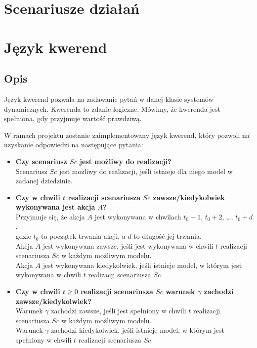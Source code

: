 \documentclass{article}
\begin{document}
\section{Scenariusze działań}


\section{Język kwerend}

\subsection{Opis}
Język kwerend pozwala na zadawanie pytań w danej klasie systemów dynamicznych. Kwerenda to zdanie logiczne. Mówimy, że kwerenda jest spełniona, gdy przyjmuje wartość prawdziwą.

W ramach projektu zostanie zaimplementowany język kwerend, który pozwoli na uzyskanie odpowiedzi na następujące pytania:
\begin{itemize}
    \item \textbf{Czy scenariusz $Sc$ jest możliwy do realizacji?}\\
    Scenariusz $Sc$ jest możliwy do realizacji, jeśli istnieje dla niego model w zadanej dziedzinie.
    \item \textbf{Czy w chwili $t$ realizacji scenariusza $Sc$ zawsze/kiedykolwiek wykonywana jest akcja $A$?}\\
    Przyjmuje się, że akcja $A$ jest wykonywana w chwilach $t_0+1$, $t_0+2$, \ldots, $t_0+d$,\\
    gdzie $t_0$ to początek trwania akcji, a $d$ to długość jej trwania.\\
    Akcja $A$ jest wykonywana zawsze, jeśli jest wykonywana w chwili $t$ realizacji scenariusza $Sc$ w każdym możliwym modelu.\\
    Akcja $A$ jest wykonywana kiedykolwiek, jeśli istnieje model, w którym jest wykonywana w chwili $t$ realizacji scenariusza $Sc$.
    \item \textbf{Czy w chwili $t \ge 0$ realizacji scenariusza $Sc$ warunek $\gamma$ zachodzi zawsze/kiedykolwiek?}\\
    Warunek $\gamma$ zachodzi zawsze, jeśli jest spełniony w chwili $t$ realizacji scenariusza $Sc$ w każdym możliwym modelu.\\
    Warunek $\gamma$ zachodzi kiedykolwiek, jeśli istnieje model, w którym jest spełniony w chwili $t$ realizacji scenariusza $Sc$.
\end{itemize}
\end{document}

